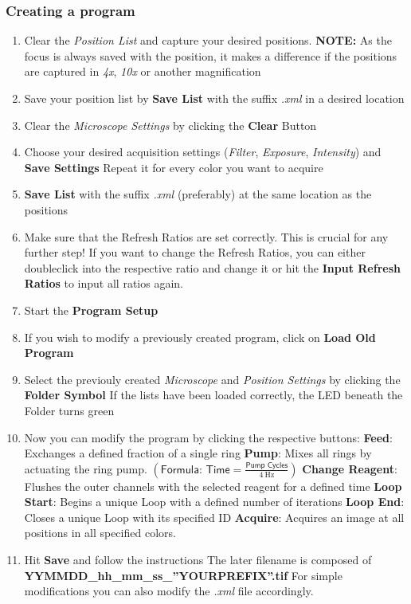 \documentclass{article}
\newcounter{ListCounter}
\begin{document}
	\subsubsection{Creating a program}
	\begin{enumerate}
		\setcounter{enumi}{\value{ListCounter}}
	\item Clear the \textit{Position List} and capture your desired positions.
	\subitem \textbf{NOTE:} As the focus is always saved with the position, it makes a difference if the positions are captured in \textit{4x}, \textit{10x} or another magnification
	\item Save your position list by \textbf{Save List} with the suffix \textit{.xml} in a desired location
	\item Clear the \textit{Microscope Settings} by clicking the \textbf{Clear} Button
	\item Choose your desired acquisition settings (\textit{Filter}, \textit{Exposure}, \textit{Intensity}) and \textbf{Save Settings}
	\subitem Repeat it for every color you want to acquire
	\item \textbf{Save List} with the suffix \textit{.xml} (preferably) at the same location as the positions
	\item Make sure that the Refresh Ratios are set correctly. This is crucial for any further step!
	\subitem If you want to change the Refresh Ratios, you can either doubleclick into the respective ratio and change it or hit the \textbf{Input Refresh Ratios} to input all ratios again.
	\item Start the \textbf{Program Setup}
	\item If you wish to modify a previously created program, click on \textbf{Load Old Program}
	\item Select the previouly created \textit{Microscope} and \textit{Position Settings} by clicking the \textbf{Folder Symbol}
	\subitem If the lists have been loaded correctly, the LED beneath the Folder turns green
	\item Now you can modify the program by clicking the respective buttons:
	\subitem \textbf{Feed}: Exchanges a defined fraction of a single ring
	\subitem \textbf{Pump}: Mixes all rings by actuating the ring pump. $\left(\textsf{Formula:\ Time}=\frac{\textsf{Pump\ Cycles}}{\SI{4}{\hertz}}\right)$
	\subitem \textbf{Change Reagent}: Flushes the outer channels with the selected reagent for a defined time
	\subitem \textbf{Loop Start}: Begins a unique Loop with a defined number of iterations 
	\subitem \textbf{Loop End}: Closes a unique Loop with its specified ID
	\subitem \textbf{Acquire}: Acquires an image at all positions in all specified colors.
	\item Hit \textbf{Save} and follow the instructions
	\subitem The later filename is composed of \textbf{YYMMDD\_{}hh\_{}mm\_{}ss\_{}''YOURPREFIX''.tif}
	\subitem For simple modifications you can also modify the \textit{.xml} file accordingly.
	
		\setcounter{ListCounter}{\value{enumi}}
\end{enumerate}
\end{document}
